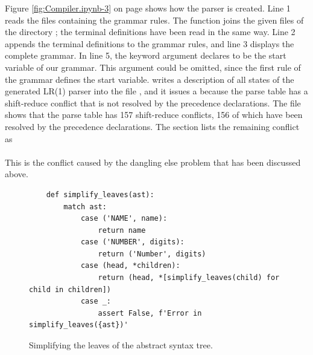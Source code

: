 \noindent
Figure \ref{fig:Compiler.ipynb-3} on page \pageref{fig:Compiler.ipynb-3} shows how the parser is created.
Line 1 reads the files containing the grammar rules.  The function  joins the given files
of the directory ; the terminal definitions have been read in the same way.  Line 2 appends the
terminal definitions to the grammar rules, and line 3 displays the complete grammar.  In line 5, the keyword
argument
 declares  to be the start variable of our grammar.  This argument could be
omitted, since the first rule of the grammar defines the start variable.   writes a description
of all states of the generated LR(1) parser into the file , and it issues a
 because the parse table has a shift-reduce conflict that is not resolved by the precedence
declarations.  The file  shows that the parse table has 157 shift-reduce conflicts, 156 of which
have been resolved by the precedence declarations.  The section  lists the remaining conflict as
\\[0.2cm]
\hspace*{1.3cm}
\\[0.2cm]
This is the conflict caused by the dangling else problem that has been discussed above.

\begin{figure}[!ht]
\centering
\begin{verbatim}
    def simplify_leaves(ast):
        match ast:
            case ('NAME', name):
                return name
            case ('NUMBER', digits):
                return ('Number', digits)
            case (head, *children):
                return (head, *[simplify_leaves(child) for child in children])
            case _:
                assert False, f'Error in simplify_leaves({ast})'
\end{verbatim}
\vspace*{-0.3cm}
\caption{Simplifying the leaves of the abstract syntax tree.}
\label{fig:Compiler.ipynb-4}
\end{figure}

